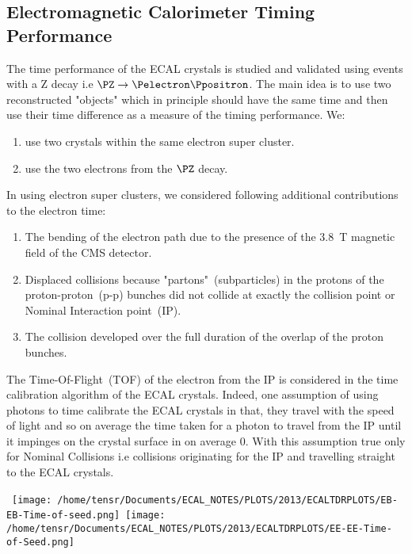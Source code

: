 \subsection{Electromagnetic Calorimeter Timing Performance}
The time performance of the ECAL crystals is studied and validated using events with a Z decay  i.e $\PZ \rightarrow \Pelectron \Ppositron$. 
\newline
The main idea is to use two reconstructed "objects" which in principle should have the same time and then use their time difference as a measure of the timing performance. We:
\begin{enumerate}
\item use two crystals within the same electron super cluster.
\item use the two electrons from the $\PZ$ decay. 
\end{enumerate}
In using electron super clusters, we considered following additional contributions to the electron time:
\begin{enumerate}
\item The bending of the electron path due to the presence of the 3.8~T magnetic field of the CMS detector.
\item  Displaced collisions  because "partons"~(subparticles) in the protons of the proton-proton~(p-p) bunches did not collide at exactly the collision point or Nominal Interaction point~(IP).
\item The collision developed over the full duration of the overlap of the proton bunches.
\end{enumerate}

The Time-Of-Flight~(TOF) of the electron from the IP is considered in the time calibration algorithm of the ECAL crystals.
Indeed, one assumption of using photons to time calibrate the ECAL crystals in that, they travel with the speed of light and so on average the time taken for a photon to travel from the IP until it impinges on the crystal surface in on average 0. With this assumption true only for Nominal Collisions i.e collisions originating for the IP and travelling straight to the ECAL crystals.
\newline


\begin{center}
\centering
\mbox{
\texttt{[image: /home/tensr/Documents/ECAL\_NOTES/PLOTS/2013/ECALTDRPLOTS/EB-EB-Time-of-seed.png]}\quad
\texttt{[image: /home/tensr/Documents/ECAL\_NOTES/PLOTS/2013/ECALTDRPLOTS/EE-EE-Time-of-Seed.png]}}
\label{fig:ZeeTimePerformance}
\end{center}

